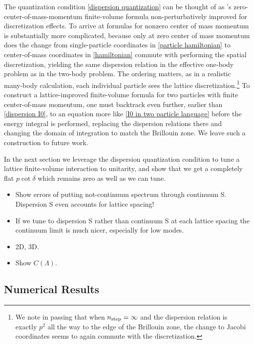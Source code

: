 The quantization condition \eqref{dispersion quantization} can be thought of as \Luscher's zero-center-of-mass-momentum finite-volume formula non-perturbatively improved for discretization effects.
To arrive at formulas for nonzero center of mass momentum is substantially more complicated, because only at zero center of mass momentum does the change from single-particle coordinates in \eqref{particle hamiltonian} to center-of-mass coordinates in \eqref{hamiltonian} commute with performing the spatial discretization, yielding the same dispersion relation in the effective one-body problem as in the two-body problem.
The ordering matters, as in a realistic many-body calculation, each individual particle sees the lattice discretization.\footnote{
We note in passing that when ${n_\text{step}}=\infty$ and the dispersion relation is exactly $p^2$ all the way to the edge of the Brillouin zone, the change to Jacobi coordinates seems to again commute with the discretization.}
To construct a lattice-improved finite-volume formula for two particles with finite center-of-mass momentum, one must backtrack even further, earlier than \eqref{dispersion I0}, to an equation more like \eqref{I0 in two particle language} before the energy integral is performed, replacing the dispersion relations there and changing the domain of integration to match the Brillouin zone.
We leave such a construction to future work.

In the next section we leverage the dispersion quantization condition to tune a lattice finite-volume interaction to unitarity, and show that we get a completely flat $p \cot \delta$ which remains zero as well as we can tune.

\begin{itemize}
    \item Show errors of putting not-continuum spectrum through continuum S.  Dispersion S even accounts for lattice spacing!
    \item If we tune to dispersion S rather than continuum S at each lattice spacing the continuum limit is much nicer, especially for low modes.
    \item 2D, 3D.
    \item Show $C(\Lambda)$.
\end{itemize}

\subsection{Numerical Results}

